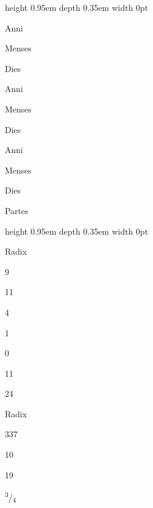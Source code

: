\documentclass[11pt]{article}
\newcommand{\LnStrut}{\vrule height 0.95em depth 0.35em width 0pt}
\newcommand{\EdL}[4]{\par\noindent\hypertarget{#2}{}\llap{\footnotesize\color{gray}#1\hspace{4mm}}#4\parbox[t]{\linewidth}{\raggedright\LnStrut #3\par}\par}
\begin{document}
\EdL{16}{AK07-J0020-L16}{\parbox[t]{\dimexpr0.0754\linewidth-0.5em\relax}{\raggedright\small\mbox{}}\hspace{0.5em}\parbox[t]{\dimexpr0.0754\linewidth-0.5em\relax}{\raggedright\small\mbox{}Anni}\hspace{0.5em}\parbox[t]{\dimexpr0.0754\linewidth-0.5em\relax}{\raggedright\small\mbox{}Menses}\hspace{0.5em}\parbox[t]{\dimexpr0.1508\linewidth-0.5em\relax}{\raggedright\small\mbox{}Dies}\hspace{0.5em}\parbox[t]{\dimexpr0.0754\linewidth-0.5em\relax}{\raggedright\small\mbox{}Anni}\hspace{0.5em}\parbox[t]{\dimexpr0.0754\linewidth-0.5em\relax}{\raggedright\small\mbox{}Menses}\hspace{0.5em}\parbox[t]{\dimexpr0.1508\linewidth-0.5em\relax}{\raggedright\small\mbox{}Dies}\hspace{0.5em}\parbox[t]{\dimexpr0.0754\linewidth-0.5em\relax}{\raggedright\small\mbox{}Anni}\hspace{0.5em}\parbox[t]{\dimexpr0.0754\linewidth-0.5em\relax}{\raggedright\small\mbox{}Menses}\hspace{0.5em}\parbox[t]{\dimexpr0.0754\linewidth-0.5em\relax}{\raggedright\small\mbox{}Dies}\hspace{0.5em}\parbox[t]{\dimexpr0.0754\linewidth-0.5em\relax}{\raggedright\small\mbox{}Partes}\hspace{0.5em}}{}
\EdL{17}{AK07-J0020-L17}{\parbox[t]{\dimexpr0.0754\linewidth-0.5em\relax}{\raggedright\small\mbox{}Radix}\hspace{0.5em}\parbox[t]{\dimexpr0.0754\linewidth-0.5em\relax}{\raggedright\small\mbox{}9}\hspace{0.5em}\parbox[t]{\dimexpr0.0754\linewidth-0.5em\relax}{\raggedright\small\mbox{}11}\hspace{0.5em}\parbox[t]{\dimexpr0.0754\linewidth-0.5em\relax}{\raggedright\small\mbox{}4}\hspace{0.5em}\parbox[t]{\dimexpr0.0754\linewidth-0.5em\relax}{\raggedright\small\mbox{}1}\hspace{0.5em}\parbox[t]{\dimexpr0.0754\linewidth-0.5em\relax}{\raggedright\small\mbox{}0}\hspace{0.5em}\parbox[t]{\dimexpr0.0754\linewidth-0.5em\relax}{\raggedright\small\mbox{}11}\hspace{0.5em}\parbox[t]{\dimexpr0.0754\linewidth-0.5em\relax}{\raggedright\small\mbox{}24}\hspace{0.5em}\parbox[t]{\dimexpr0.0754\linewidth-0.5em\relax}{\raggedright\small\mbox{}Radix}\hspace{0.5em}\parbox[t]{\dimexpr0.0754\linewidth-0.5em\relax}{\raggedright\small\mbox{}337}\hspace{0.5em}\parbox[t]{\dimexpr0.0754\linewidth-0.5em\relax}{\raggedright\small\mbox{}10}\hspace{0.5em}\parbox[t]{\dimexpr0.0754\linewidth-0.5em\relax}{\raggedright\small\mbox{}19}\hspace{0.5em}\parbox[t]{\dimexpr0.0754\linewidth-0.5em\relax}{\raggedright\small\mbox{}\textsuperscript{3}/\textsubscript{4}}\hspace{0.5em}}{}
\end{document}

